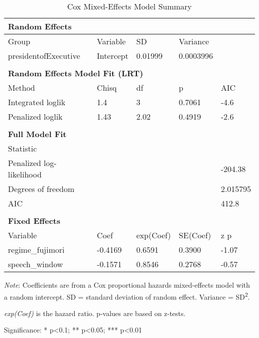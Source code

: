 \begin{table}[ht]
\centering
\begin{threeparttable}
\caption{Cox Mixed-Effects Model Summary}
\label{tab:coxme_auto}
\begin{tabular}{lllll}
\toprule
\multicolumn{5}{l}{\textbf{Random Effects}} \\
\midrule
Group & Variable & SD & Variance & \\
presidentofExecutive & Intercept &  0.01999  &  0.0003996  & \\
\\
\multicolumn{5}{l}{\textbf{Random Effects Model Fit (LRT)}} \\
\midrule
Method & Chisq & df & p & AIC \\
Integrated loglik &  1.4  &  3  &  0.7061  &  -4.6  \\
Penalized loglik &  1.43  &  2.02  &  0.4919  &  -2.6  \\
\\
\multicolumn{5}{l}{\textbf{Full Model Fit}} \\
\midrule
Statistic & & & & \\
Penalized log-likelihood & & & &  -204.38  \\
Degrees of freedom & & & &  2.015795  \\
AIC & & & &  412.8  \\
\\
\multicolumn{5}{l}{\textbf{Fixed Effects}} \\
\midrule
Variable & Coef & exp(Coef) & SE(Coef) & z \quad p \\
 regime_fujimori & -0.4169 & 0.6591 & 0.3900 & -1.07 \quad 0.285 \\
speech_window & -0.1571 & 0.8546 & 0.2768 & -0.57 \quad 0.569 \\ 
\bottomrule
\end{tabular}
\begin{tablenotes}
\footnotesize
\item \textit{Note}: Coefficients are from a Cox proportional hazards mixed-effects model with a random intercept. SD = standard deviation of random effect. Variance = SD\textsuperscript{2}.
\item \textit{exp(Coef)} is the hazard ratio. p-values are based on z-tests.
\item Significance: * p<0.1; ** p<0.05; *** p<0.01
\end{tablenotes}
\end{threeparttable}
\end{table}
